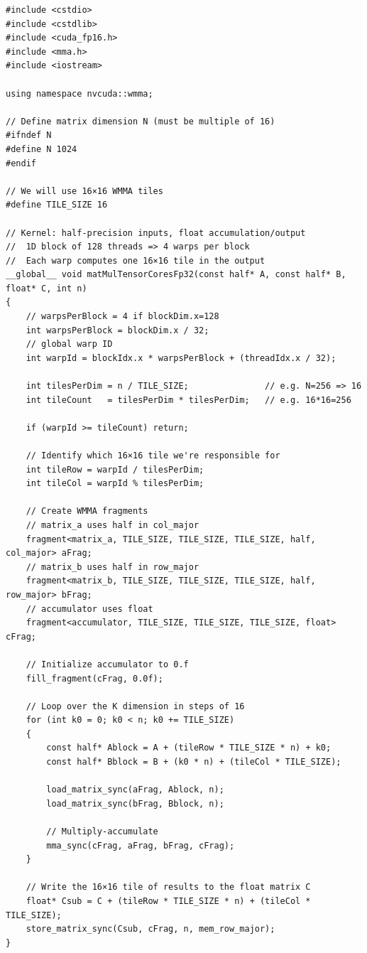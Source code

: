 \begin{lstlisting}
#include <cstdio>
#include <cstdlib>
#include <cuda_fp16.h>
#include <mma.h>
#include <iostream>

using namespace nvcuda::wmma;

// Define matrix dimension N (must be multiple of 16)
#ifndef N
#define N 1024
#endif

// We will use 16×16 WMMA tiles
#define TILE_SIZE 16

// Kernel: half-precision inputs, float accumulation/output
//  1D block of 128 threads => 4 warps per block
//  Each warp computes one 16×16 tile in the output
__global__ void matMulTensorCoresFp32(const half* A, const half* B, float* C, int n)
{
    // warpsPerBlock = 4 if blockDim.x=128
    int warpsPerBlock = blockDim.x / 32;
    // global warp ID
    int warpId = blockIdx.x * warpsPerBlock + (threadIdx.x / 32);

    int tilesPerDim = n / TILE_SIZE;               // e.g. N=256 => 16
    int tileCount   = tilesPerDim * tilesPerDim;   // e.g. 16*16=256

    if (warpId >= tileCount) return;

    // Identify which 16×16 tile we're responsible for
    int tileRow = warpId / tilesPerDim;
    int tileCol = warpId % tilesPerDim;

    // Create WMMA fragments
    // matrix_a uses half in col_major
    fragment<matrix_a, TILE_SIZE, TILE_SIZE, TILE_SIZE, half, col_major> aFrag;
    // matrix_b uses half in row_major
    fragment<matrix_b, TILE_SIZE, TILE_SIZE, TILE_SIZE, half, row_major> bFrag;
    // accumulator uses float
    fragment<accumulator, TILE_SIZE, TILE_SIZE, TILE_SIZE, float> cFrag;

    // Initialize accumulator to 0.f
    fill_fragment(cFrag, 0.0f);

    // Loop over the K dimension in steps of 16
    for (int k0 = 0; k0 < n; k0 += TILE_SIZE)
    {
        const half* Ablock = A + (tileRow * TILE_SIZE * n) + k0;
        const half* Bblock = B + (k0 * n) + (tileCol * TILE_SIZE);

        load_matrix_sync(aFrag, Ablock, n);
        load_matrix_sync(bFrag, Bblock, n);

        // Multiply-accumulate
        mma_sync(cFrag, aFrag, bFrag, cFrag);
    }

    // Write the 16×16 tile of results to the float matrix C
    float* Csub = C + (tileRow * TILE_SIZE * n) + (tileCol * TILE_SIZE);
    store_matrix_sync(Csub, cFrag, n, mem_row_major);
}



\end{lstlisting}
